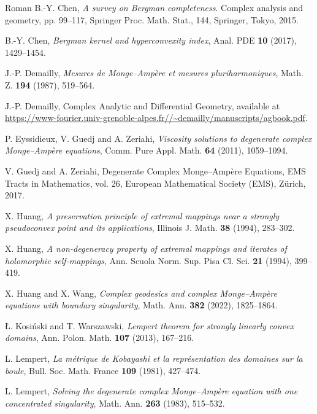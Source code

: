 \documentclass[12pt,a4paper]{amsart}
\numberwithin{equation}{section}
\theoremstyle{definition}
\begin{document}
\begin{thebibliography}{\;\;\; Roman}
 B.-Y. Chen, {\it  A survey on Bergman completeness}. Complex analysis and geometry, pp. 99--117, Springer Proc. Math. Stat., 144, Springer, Tokyo, 2015.


 B.-Y. Chen, {\it  Bergman kernel and hyperconvexity index}, Anal. PDE {\bf 10} (2017), 1429--1454.

 J.-P. Demailly, {\it Mesures de Monge--Amp\`{e}re et mesures pluriharmoniques}, Math. Z. {\bf 194} (1987),  519--564.


 J.-P. Demailly, Complex Analytic and Differential Geometry, available  at \url{https://www-fourier.univ-grenoble-alpes.fr//~demailly/manuscripts/agbook.pdf}.


 P. Eyssidieux, V. Guedj and A. Zeriahi, {\it Viscosity solutions to degenerate complex Monge--Amp\`{e}re equations}, Comm. Pure Appl. Math. {\bf 64} (2011), 1059--1094.



 V. Guedj and A. Zeriahi, Degenerate Complex Monge--Amp\`{e}re Equations, EMS Tracts in Mathematics, vol. 26, European Mathematical Society (EMS), Z\"{u}rich, 2017.

 X. Huang, {\it A preservation principle of extremal mappings near a strongly pseudoconvex point and its applications}, Illinois J. Math. {\bf 38} (1994), 283--302.

 X. Huang, {\it A non-degeneracy property of extremal mappings and iterates of holomorphic self-mappings},  Ann. Scuola Norm. Sup. Pisa Cl. Sci.  {\bf 21} (1994), 399--419.

 X. Huang and X. Wang, {\it Complex geodesics and complex Monge--Amp\`{e}re equations with boundary singularity}, Math. Ann. {\bf 382} (2022), 1825--1864.

 {\L}. Kosi\'{n}ski and T. Warszawski, {\it Lempert theorem for strongly linearly convex domains}, Ann. Polon. Math. {\bf 107} (2013), 167--216.

  L. Lempert, {\it La m\'{e}trique de Kobayashi et la repr\'{e}sentation des domaines sur la boule},  Bull. Soc. Math. France  {\bf 109} (1981), 427--474.

 L. Lempert, {\it Solving the degenerate complex Monge--Amp\`{e}re equation with one concentrated singularity}, Math. Ann. {\bf 263} (1983), 515--532.


\end{thebibliography}
\end{document}
